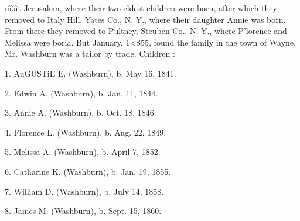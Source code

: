 \^m\^.\^ 




at Jerusalem, where their two eldest children were born, after 
which they removed to Italy Hill, Yates Co., N. Y., where their 
daughter Annie was born. From there they removed to Pultney, 
Steuben Co., N. Y., where P'lorence and Melissa were boria. 
But January, 1<S55, found the family in the town of Wayne. 
Mr. Washburn was a tailor by trade. Children : 

1. AuGUSTiE E. (Washburn), b. May 16, 1841. 

2. Edwin A. (Washburn), b. Jan. 11, 1844. 

3. Annie A. (Washburn), b. Oct. 18, 1846. 

4. Florence L. (Washburn), b. Aug. 22, 1849. 

5. Melissa A. (Washburn), b. April 7, 1852. 

6. Catharine K. (Washburn), b. Jan. 19, 1855. 

7. William D. (Washburn), b. July 14, 1858. 

8. James M. (Washburn), b. Sept. 15, 1860. 

